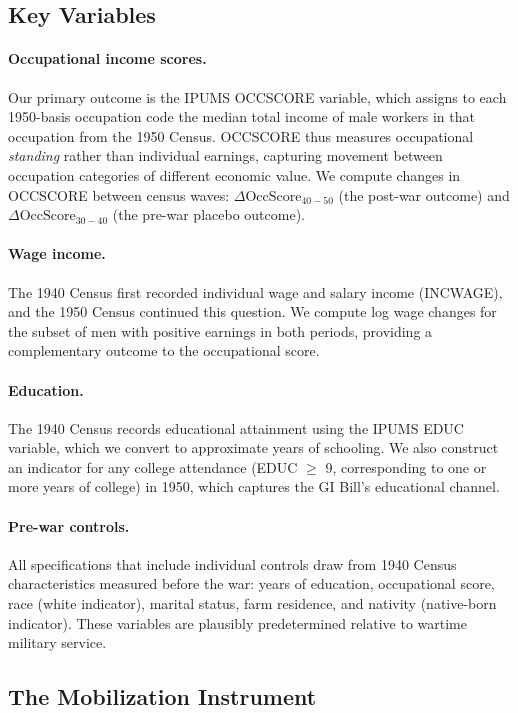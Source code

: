 \documentclass[12pt]{article}
\begin{document}
\subsection{Key Variables}

\paragraph{Occupational income scores.} Our primary outcome is the IPUMS OCCSCORE variable, which assigns to each 1950-basis occupation code the median total income of male workers in that occupation from the 1950 Census. OCCSCORE thus measures occupational \textit{standing} rather than individual earnings, capturing movement between occupation categories of different economic value. We compute changes in OCCSCORE between census waves: $\Delta \text{OccScore}_{40-50}$ (the post-war outcome) and $\Delta \text{OccScore}_{30-40}$ (the pre-war placebo outcome).

\paragraph{Wage income.} The 1940 Census first recorded individual wage and salary income (INCWAGE), and the 1950 Census continued this question. We compute log wage changes for the subset of men with positive earnings in both periods, providing a complementary outcome to the occupational score.

\paragraph{Education.} The 1940 Census records educational attainment using the IPUMS EDUC variable, which we convert to approximate years of schooling. We also construct an indicator for any college attendance (EDUC $\geq$ 9, corresponding to one or more years of college) in 1950, which captures the GI Bill's educational channel.

\paragraph{Pre-war controls.} All specifications that include individual controls draw from 1940 Census characteristics measured before the war: years of education, occupational score, race (white indicator), marital status, farm residence, and nativity (native-born indicator). These variables are plausibly predetermined relative to wartime military service.

\subsection{The Mobilization Instrument}
\end{document}
